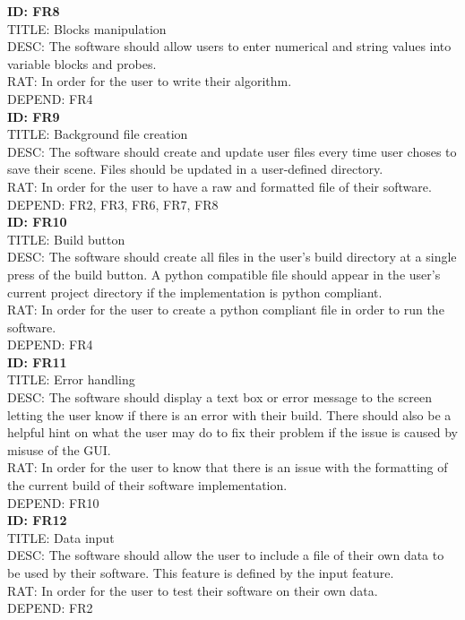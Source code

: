 \documentclass[journal,10pt,onecolumn,compsoc]{IEEEtran} \usepackage[margin=1.0in]{geometry} \usepackage{pdfpages} \usepackage{graphicx}
\begin{document}
\noindent
\textbf{ID: FR8}\\
TITLE: Blocks manipulation\\
DESC: The software should allow users to enter numerical and string values into variable blocks and probes.\\
RAT: In order for the user to write their algorithm.\\
DEPEND: FR4\\

\noindent
\textbf{ID: FR9}\\
TITLE: Background file creation\\
DESC: The software should create and update user files every time user choses to save their scene. 
Files should be updated in a user-defined directory.\\
RAT: In order for the user to have a raw and formatted file of their software.\\
DEPEND: FR2, FR3, FR6, FR7, FR8\\

\noindent
\textbf{ID: FR10}\\
TITLE: Build button\\
DESC: The software should create all files in the user's build directory at a single press of the build button. 
A python compatible file should appear in the user's current project directory if the implementation is python compliant.\\
RAT: In order for the user to create a python compliant file in order to run the software.\\
DEPEND: FR4\\

\noindent
\textbf{ID: FR11}\\
TITLE: Error handling\\
DESC: The software should display a text box or error message to the screen letting the user know if there is an error with their build. 
There should also be a helpful hint on what the user may do to fix their problem if the issue is caused by misuse of the GUI.\\
RAT: In order for the user to know that there is an issue with the formatting of the current build of their software implementation.\\
DEPEND: FR10\\

\noindent
\textbf{ID: FR12}\\
TITLE: Data input\\
DESC: The software should allow the user to include a file of their own data to be used by their software.
This feature is defined by the input feature.\\
RAT: In order for the user to test their software on their own data.\\
DEPEND: FR2\\
\end{document}
